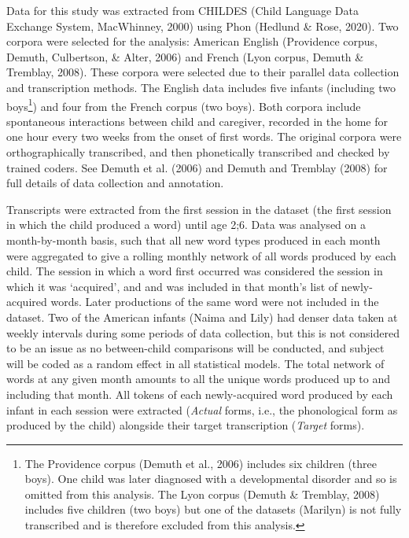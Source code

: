 \documentclass[
  man]{apa6}
\begin{document}
Data for this study was extracted from CHILDES (Child Language Data Exchange System, MacWhinney, 2000) using Phon (Hedlund \& Rose, 2020). Two corpora were selected for the analysis: American English (Providence corpus, Demuth, Culbertson, \& Alter, 2006) and French (Lyon corpus, Demuth \& Tremblay, 2008). These corpora were selected due to their parallel data collection and transcription methods. The English data includes five infants (including two boys\footnote{The Providence corpus (Demuth et al., 2006) includes six children (three boys). One child was later diagnosed with a developmental disorder and so is omitted from this analysis. The Lyon corpus (Demuth \& Tremblay, 2008) includes five children (two boys) but one of the datasets (Marilyn) is not fully transcribed and is therefore excluded from this analysis.}) and four from the French corpus (two boys). Both corpora include spontaneous interactions between child and caregiver, recorded in the home for one hour every two weeks from the onset of first words. The original corpora were orthographically transcribed, and then phonetically transcribed and checked by trained coders. See Demuth et al. (2006) and Demuth and Tremblay (2008) for full details of data collection and annotation.

Transcripts were extracted from the first session in the dataset (the first session in which the child produced a word) until age 2;6. Data was analysed on a month-by-month basis, such that all new word types produced in each month were aggregated to give a rolling monthly network of all words produced by each child. The session in which a word first occurred was considered the session in which it was `acquired', and and was included in that month's list of newly-acquired words. Later productions of the same word were not included in the dataset. Two of the American infants (Naima and Lily) had denser data taken at weekly intervals during some periods of data collection, but this is not considered to be an issue as no between-child comparisons will be conducted, and subject will be coded as a random effect in all statistical models. The total network of words at any given month amounts to all the unique words produced up to and including that month. All tokens of each newly-acquired word produced by each infant in each session were extracted (\emph{Actual} forms, i.e., the phonological form as produced by the child) alongside their target transcription (\emph{Target} forms).
\end{document}
